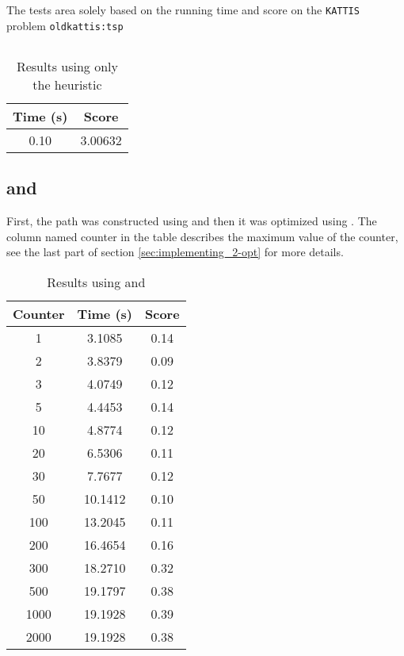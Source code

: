 The tests area solely based on the running time and score on the
\texttt{KATTIS}~\cite{kattis} problem \texttt{oldkattis:tsp}~\cite{kattis-tsp}

\subsection{}
\begin{table}[ht!]
    \centering
    \begin{tabular}{|c|c|}
        \hline 
        \textbf{Time (s)} & \textbf{Score} \\ \hline
        0.10 & 3.00632 \\ \hline
    \end{tabular}
    \caption{Results using only the  heuristic}
    \label{table:nn}
\end{table}

\subsection{ and }
First, the path was constructed using  and then it was
optimized using . The column named counter in the table describes
the maximum value of the counter, see the last part of section
\ref{sec:implementing_2-opt} for more details.
\begin{table}[ht!]
    \centering
    \begin{tabular}{|c|c|c|}
        \hline
        \textbf{Counter} & \textbf{Time (s)} & \textbf{Score} \\ \hline
            1 &  3.1085 & 0.14 \\ \hline
            2 &  3.8379 & 0.09 \\ \hline
            3 &  4.0749 & 0.12 \\ \hline
            5 &  4.4453 & 0.14 \\ \hline
           10 &  4.8774 & 0.12 \\ \hline
           20 &  6.5306 & 0.11 \\ \hline
           30 &  7.7677 & 0.12 \\ \hline
           50 & 10.1412 & 0.10 \\ \hline
          100 & 13.2045 & 0.11 \\ \hline
          200 & 16.4654 & 0.16 \\ \hline
          300 & 18.2710 & 0.32 \\ \hline
          500 & 19.1797 & 0.38 \\ \hline
         1000 & 19.1928 & 0.39 \\ \hline
         2000 & 19.1928 & 0.38 \\ \hline
    
    \end{tabular}
    \caption{Results using  and }
    \label{table:nn_and_2-opt}
\end{table}

